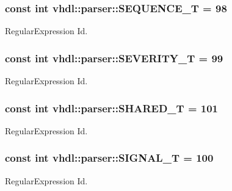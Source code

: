 \subsubsection[{S\+E\+Q\+U\+E\+N\+C\+E\+\_\+\+T}]{\setlength{\rightskip}{0pt plus 5cm}const int vhdl\+::parser\+::\+S\+E\+Q\+U\+E\+N\+C\+E\+\_\+\+T = 98}\label{namespacevhdl_1_1parser_a728e946f7da786ad91f5b9c1b5c9b2ec}
Regular\+Expression Id. \hypertarget{namespacevhdl_1_1parser_acfb44eaedd191001ed62fd5b1dc71109}{}
\subsubsection[{S\+E\+V\+E\+R\+I\+T\+Y\+\_\+\+T}]{\setlength{\rightskip}{0pt plus 5cm}const int vhdl\+::parser\+::\+S\+E\+V\+E\+R\+I\+T\+Y\+\_\+\+T = 99}\label{namespacevhdl_1_1parser_acfb44eaedd191001ed62fd5b1dc71109}
Regular\+Expression Id. \hypertarget{namespacevhdl_1_1parser_aab5bfe2c8ce049623517933ec4e533d0}{}
\subsubsection[{S\+H\+A\+R\+E\+D\+\_\+\+T}]{\setlength{\rightskip}{0pt plus 5cm}const int vhdl\+::parser\+::\+S\+H\+A\+R\+E\+D\+\_\+\+T = 101}\label{namespacevhdl_1_1parser_aab5bfe2c8ce049623517933ec4e533d0}
Regular\+Expression Id. \hypertarget{namespacevhdl_1_1parser_a06ed55dc5ef09a06834ade6060012361}{}
\subsubsection[{S\+I\+G\+N\+A\+L\+\_\+\+T}]{\setlength{\rightskip}{0pt plus 5cm}const int vhdl\+::parser\+::\+S\+I\+G\+N\+A\+L\+\_\+\+T = 100}\label{namespacevhdl_1_1parser_a06ed55dc5ef09a06834ade6060012361}
Regular\+Expression Id. \hypertarget{namespacevhdl_1_1parser_abc3db8b1459661dec018d8725844f642}{}
